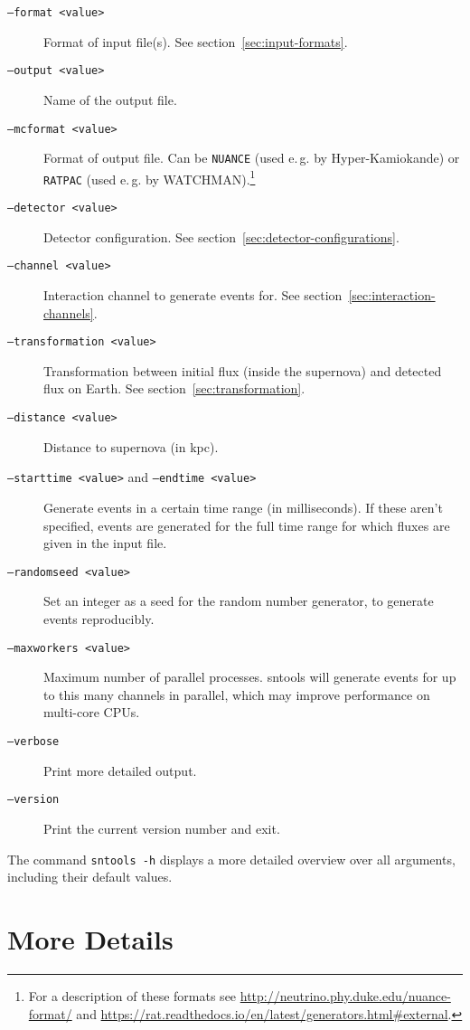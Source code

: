 \documentclass[11pt, oneside]{article}
\begin{document}
\begin{description}
\item[\texttt{--format <value>}] Format of input file(s). See section~\ref{sec:input-formats}.
\item[\texttt{--output <value>}] Name of the output file.
\item[\texttt{--mcformat <value>}] Format of output file. Can be \texttt{NUANCE} (used e.\,g. by Hyper-Kamiokande) or \texttt{RATPAC} (used e.\,g. by WATCHMAN).\footnote{For a description of these formats see \url{http://neutrino.phy.duke.edu/nuance-format/} and \url{https://rat.readthedocs.io/en/latest/generators.html\#external}.}

\item[\texttt{--detector <value>}] Detector configuration. See section~\ref{sec:detector-configurations}.
\item[\texttt{--channel <value>}] Interaction channel to generate events for. See section~\ref{sec:interaction-channels}.
\item[\texttt{--transformation <value>}] Transformation between initial flux (inside the supernova) and detected flux on Earth. See section~\ref{sec:transformation}.
\item[\texttt{--distance <value>}] Distance to supernova (in kpc).
\item[\texttt{--starttime <value>} and \texttt{--endtime <value>}] Generate events in a certain time range (in milliseconds). If these aren’t specified, events are generated for the full time range for which fluxes are given in the input file.
\item[\texttt{--randomseed <value>}] Set an integer as a seed for the random number generator, to generate events reproducibly.
\item[\texttt{--maxworkers <value>}] Maximum number of parallel processes. sntools will generate events for up to this many channels in parallel, which may improve performance on multi-core CPUs.
\item[\texttt{--verbose}] Print more detailed output.
\item[\texttt{--version}] Print the current version number and exit.
\end{description}

The command \texttt{sntools -h} displays a more detailed overview over all arguments, including their default values.



\section{More Details}
\end{document}
